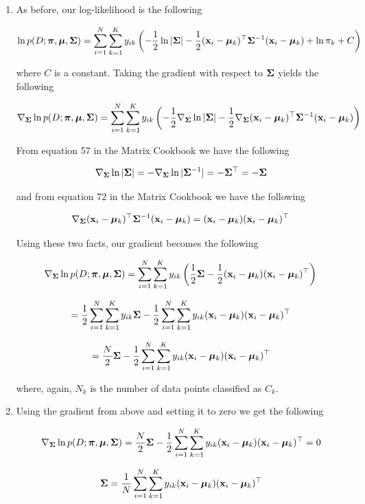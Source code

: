 \documentclass[submit]{harvardml}
\begin{document}
\begin{enumerate}
\item 

As before, our log-likelihood is the following

$$ \ln p(D; \boldsymbol{\pi}, \boldsymbol{\mu}, \mathbf{\Sigma}) = \sum_{i=1}^N \sum_{k=1}^K  y_{ik} \left(  -\frac{1}{2} \ln |\mathbf{\Sigma}| - \frac{1}{2} (\mathbf{x}_i - \boldsymbol{\mu}_k)^\top \mathbf{\Sigma}^{-1} (\mathbf{x}_i - \boldsymbol{\mu}_k) + \ln \pi_k + C\right) $$ 

where $C$ is a constant. Taking the gradient with respect to $\mathbf{\Sigma}$ yields the following

$$ \nabla_{\mathbf{\Sigma}} \ln p(D; \boldsymbol{\pi}, \boldsymbol{\mu}, \mathbf{\Sigma}) = \sum_{i=1}^N \sum_{k=1}^K  y_{ik} \left(  -\frac{1}{2} \nabla_{\mathbf{\Sigma}} \ln |\mathbf{\Sigma}| - \frac{1}{2} \nabla_{\mathbf{\Sigma}} (\mathbf{x}_i - \boldsymbol{\mu}_k)^\top \mathbf{\Sigma}^{-1} (\mathbf{x}_i - \boldsymbol{\mu}_k) \right) $$ 

From equation 57 in the Matrix Cookbook we have the following

$$  \nabla_{\mathbf{\Sigma}} \ln |\mathbf{\Sigma}| =  -\nabla_{\mathbf{\Sigma}} \ln |\mathbf{\Sigma}^{-1}| =  -\mathbf{\Sigma}^{\top} = -\mathbf{\Sigma} $$

and from equation 72 in the Matrix Cookbook we have the following

$$ \nabla_{\mathbf{\Sigma}} (\mathbf{x}_i - \boldsymbol{\mu}_k)^\top \mathbf{\Sigma}^{-1} (\mathbf{x}_i - \boldsymbol{\mu}_k) = (\mathbf{x}_i - \boldsymbol{\mu}_k) (\mathbf{x}_i - \boldsymbol{\mu}_k) ^\top  $$

Using these two facts, our gradient becomes the following

$$ \nabla_{\mathbf{\Sigma}} \ln p(D; \boldsymbol{\pi}, \boldsymbol{\mu}, \mathbf{\Sigma}) = \sum_{i=1}^N \sum_{k=1}^K  y_{ik} \left(  \frac{1}{2} \mathbf{\Sigma}  - \frac{1}{2} (\mathbf{x}_i - \boldsymbol{\mu}_k)(\mathbf{x}_i - \boldsymbol{\mu}_k)^{\top} \right) $$ 

$$ =  \frac{1}{2} \sum_{i=1}^N \sum_{k=1}^K y_{ik} \mathbf{\Sigma}  - \frac{1}{2} \sum_{i=1}^N \sum_{k=1}^K y_{ik} (\mathbf{x}_i - \boldsymbol{\mu}_k)(\mathbf{x}_i - \boldsymbol{\mu}_k)^{\top}  $$

$$ =  \frac{N}{2} \mathbf{\Sigma}  - \frac{1}{2} \sum_{i=1}^N \sum_{k=1}^K y_{ik} (\mathbf{x}_i - \boldsymbol{\mu}_k)(\mathbf{x}_i - \boldsymbol{\mu}_k)^{\top}  $$

where, again, $N_k$ is the number of data points classified as $C_k$.

\item 

Using the gradient from above and setting it to zero we get the following

$$\nabla_{\mathbf{\Sigma}} \ln p(D; \boldsymbol{\pi}, \boldsymbol{\mu}, \mathbf{\Sigma}) =  \frac{N}{2} \mathbf{\Sigma}  - \frac{1}{2} \sum_{i=1}^N \sum_{k=1}^K y_{ik} (\mathbf{x}_i - \boldsymbol{\mu}_k)(\mathbf{x}_i - \boldsymbol{\mu}_k)^{\top} = 0$$

$$ \mathbf{\Sigma} = \frac{1}{N} \sum_{i=1}^N \sum_{k=1}^K y_{ik} (\mathbf{x}_i - \boldsymbol{\mu}_k)(\mathbf{x}_i - \boldsymbol{\mu}_k)^{\top} $$

\end{enumerate}
\end{document}
